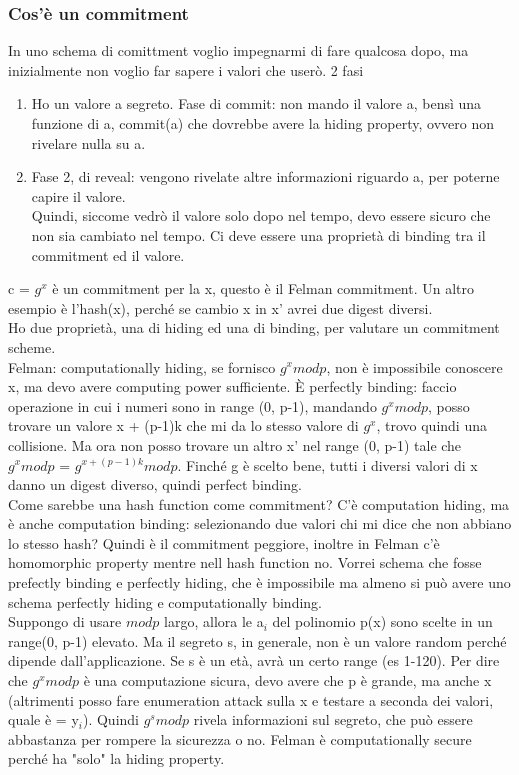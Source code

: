 \documentclass[16px]{article}
\begin{document}
\subsubsection{Cos'è un commitment}
In uno schema di comittment voglio impegnarmi di fare qualcosa dopo, ma inizialmente non voglio far sapere i valori che userò. 2 fasi
\begin{enumerate}
\item Ho un valore a segreto. Fase di commit: non mando il valore a, bensì una funzione di a, commit(a) che dovrebbe avere la hiding property, ovvero non rivelare nulla su a.
\item Fase 2, di reveal: vengono rivelate altre informazioni riguardo a, per poterne capire il valore.\\ Quindi, siccome vedrò il valore solo dopo nel tempo, devo essere sicuro che non sia cambiato nel tempo. Ci deve essere una proprietà di binding tra il commitment ed il valore.
\end{enumerate}
c = $g^x$ è un commitment per la x, questo è il Felman commitment. Un altro esempio è l'hash(x), perché se cambio x in x' avrei due digest diversi.\\ Ho due proprietà, una di hiding ed una di binding, per valutare un commitment scheme.\\ Felman: computationally hiding, se fornisco $g^xmodp$, non è impossibile conoscere x, ma devo avere computing power sufficiente. È perfectly binding: faccio operazione in cui i numeri sono in range (0, p-1), mandando $g^xmodp$, posso trovare un valore x + (p-1)k che mi da lo stesso valore di $g^x$, trovo quindi una collisione. Ma ora non posso trovare un altro x' nel range (0, p-1) tale che  $g^xmodp$ = $g^{x + (p-1)k}modp$. Finché g è scelto bene, tutti i diversi valori di x danno un digest diverso, quindi perfect binding.\\ Come sarebbe una hash function come commitment? C'è computation hiding, ma è anche computation binding: selezionando due valori chi mi dice che non abbiano lo stesso hash? Quindi è il commitment peggiore, inoltre in Felman c'è homomorphic property mentre nell hash function no. Vorrei schema che fosse prefectly binding e perfectly hiding, che è impossibile ma almeno si può avere uno schema perfectly hiding e computationally binding.\\ Suppongo di usare $modp$ largo, allora le a$_i$ del polinomio p(x) sono scelte in un range(0, p-1) elevato. Ma il segreto s, in generale, non è un valore random perché dipende dall'applicazione. Se s è un età, avrà un certo range (es 1-120). Per dire che $g^xmodp$ è una computazione sicura, devo avere che p è grande, ma anche x (altrimenti posso fare enumeration attack sulla x e testare a seconda dei valori, quale è = y$_i$). Quindi $g^smodp$ rivela informazioni sul segreto, che può essere abbastanza per rompere la sicurezza o no. Felman è computationally secure perché ha "solo" la hiding property.
\end{document}
